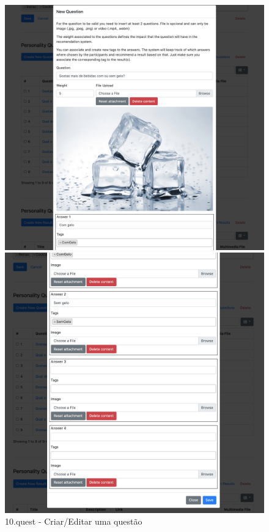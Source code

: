 \begin{figure}[ht!]
	\begin{center}
		\begin{minipage}{0.45\textwidth}
			\begin{center}
				\includegraphics[height=.3\textheight]{img/product/pq_q1}
				\caption{10.quest - Criar/Editar uma questão}
				\label{fig:pq_q1}
			\end{center}
		\end{minipage}
		\hspace{1cm}
		\begin{minipage}{0.45\textwidth}
			\begin{center}
				\includegraphics[height=.3\textheight]{img/product/pq_q2}

\end{center}
\end{minipage}
\end{center}
\end{figure}
